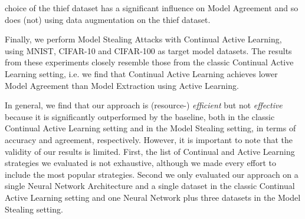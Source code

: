 choice of the thief dataset has a significant influence on Model Agreement and so does (not) using data augmentation on the thief dataset. \par
Finally, we perform Model Stealing Attacks with Continual Active Learning, using MNIST, CIFAR-10 and CIFAR-100 as target model datasets.
The results from these experiments closely resemble those from the classic Continual Active Learning setting, i.e. we find that Continual
Active Learning achieves lower Model Agreement than Model Extraction using Active Learning. \par
In general, we find that our approach is (resource-) \textit{efficient} but not \textit{effective} because it is significantly outperformed
by the baseline, both in the classic Continual Active Learning setting and in the Model Stealing setting, in terms of accuracy and agreement,
respectively. However, it is important to note that the validity of our results is limited. First, the list of Continual and Active Learning
strategies we evaluated is not exhaustive, although we made every effort to include the most popular strategies. Second we only evaluated our
approach on a single Neural Network Architecture and a single dataset in the classic Continual Active Learning setting and one Neural Network
plus three datasets in the Model Stealing setting.
